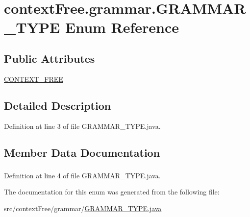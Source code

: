 \hypertarget{enumcontext_free_1_1grammar_1_1_g_r_a_m_m_a_r___t_y_p_e}{\section{context\-Free.\-grammar.\-G\-R\-A\-M\-M\-A\-R\-\_\-\-T\-Y\-P\-E Enum Reference}
\label{enumcontext_free_1_1grammar_1_1_g_r_a_m_m_a_r___t_y_p_e}
}
\subsection*{Public Attributes}
\begin{DoxyCompactItemize}
\item 
\hyperlink{enumcontext_free_1_1grammar_1_1_g_r_a_m_m_a_r___t_y_p_e_a1716ccff248a4c662919f646073266e2}{C\-O\-N\-T\-E\-X\-T\-\_\-\-F\-R\-E\-E}
\end{DoxyCompactItemize}


\subsection{Detailed Description}


Definition at line 3 of file G\-R\-A\-M\-M\-A\-R\-\_\-\-T\-Y\-P\-E.\-java.



\subsection{Member Data Documentation}
\hypertarget{enumcontext_free_1_1grammar_1_1_g_r_a_m_m_a_r___t_y_p_e_a1716ccff248a4c662919f646073266e2}{
\subsubsection[{C\-O\-N\-T\-E\-X\-T\-\_\-\-F\-R\-E\-E}]{}}\label{enumcontext_free_1_1grammar_1_1_g_r_a_m_m_a_r___t_y_p_e_a1716ccff248a4c662919f646073266e2}


Definition at line 4 of file G\-R\-A\-M\-M\-A\-R\-\_\-\-T\-Y\-P\-E.\-java.



The documentation for this enum was generated from the following file\-:\begin{DoxyCompactItemize}
\item 
src/context\-Free/grammar/\hyperlink{_g_r_a_m_m_a_r___t_y_p_e_8java}{G\-R\-A\-M\-M\-A\-R\-\_\-\-T\-Y\-P\-E.\-java}\end{DoxyCompactItemize}
